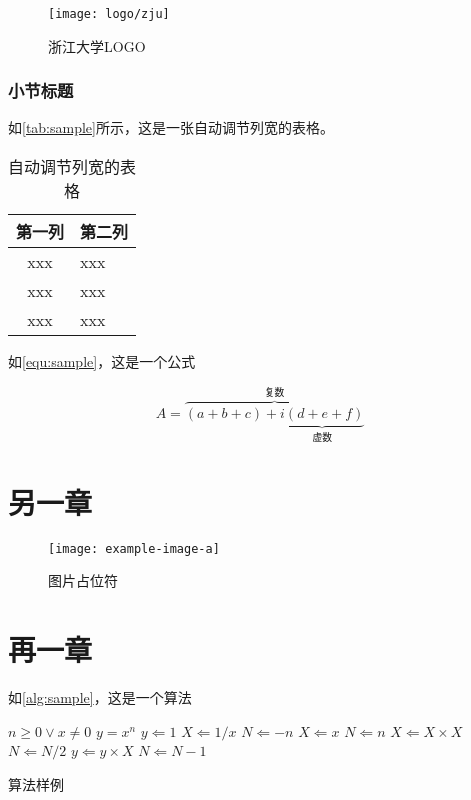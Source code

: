 \begin{figure}[htbp]
    \centering
    \texttt{[image: logo/zju]}
    \caption{\label{fig:zju-logo}浙江大学LOGO}
\end{figure}


\subsection{小节标题}


\par 如\autoref{tab:sample}所示，这是一张自动调节列宽的表格。

\begin{table}[htbp]
    \caption{\label{tab:sample}自动调节列宽的表格}
    \begin{tabularx}{\linewidth}{c|X<{\centering}}
        \hline
        第一列 & 第二列 \\ \hline
        xxx & xxx \\ \hline
        xxx & xxx \\ \hline
        xxx & xxx \\ \hline
    \end{tabularx}
\end{table}


\par 如\autoref{equ:sample}，这是一个公式

\begin{equation}
    \label{equ:sample}
    A=\overbrace{(a+b+c)+\underbrace{i(d+e+f)}_{\text{虚数}}}^{\text{复数}}
\end{equation}

\chapter{另一章}


\begin{figure}[htbp]
    \centering
    \texttt{[image: example-image-a]}
    \caption{\label{fig:fig-placeholder}图片占位符}
\end{figure}

\chapter{再一章}

\par 如\autoref{alg:sample}，这是一个算法

\begin{algorithm}[H]
    \begin{algorithmic} %
        \REQUIRE $n \geq 0 \vee x \neq 0$
        \ENSURE $y = x^n$
        \STATE $y \Leftarrow 1$
        \STATE $X \Leftarrow 1 / x$
        \STATE $N \Leftarrow -n$
        \ELSE
        \STATE $X \Leftarrow x$
        \STATE $N \Leftarrow n$
        \ENDIF
        \STATE $X \Leftarrow X \times X$
        \STATE $N \Leftarrow N / 2$
        \ELSE[$N$ is odd]
        \STATE $y \Leftarrow y \times X$
        \STATE $N \Leftarrow N - 1$
        \ENDIF
        \ENDWHILE
    \end{algorithmic}
    \caption{\label{alg:sample}算法样例}
\end{algorithm}